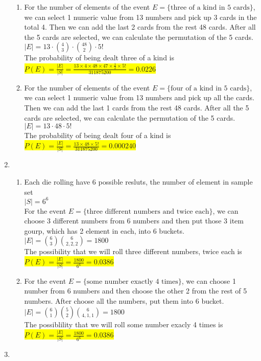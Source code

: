 \documentclass{article}
\begin{document}
\begin{enumerate}
\begin{enumerate}
		\item
		\mysolu
		For the number of elements of the event ${E=\{\text{three of a kind in 5 cards}\}}$, we can select 1 numeric value from 13 numbers and pick up 3 cards in the total 4. Then we can add the last 2 cards from the rest 48 cards. After all the 5 cards are selected, we can calculate the permutation of the 5 cards.\\
		${|E|=13\cdot{4 \choose 3} \cdot{48 \choose 2}\cdot 5!}$\\
		\myansw
		The probability of being dealt three of a kind is\\
		\colorbox{yellow}{
			${P(E)=\frac{|E|}{|S|}=\frac{13\times4\times48\times47\times \frac{1}{2} \times 5!}{311875200}=0.0226}$
		}
		
		\item
		\mysolu
		For the number of elements of the event ${E=\{\text{four of a kind in 5 cards}\}}$, we can select 1 numeric value from 13 numbers and pick up all the cards. Then we can add the last 1 cards from the rest 48 cards. After all the 5 cards are selected, we can calculate the permutation of the 5 cards.\\
		${|E|=13\cdot 48\cdot 5!}$\\
		\myansw
		The probability of being dealt four of a kind is\\
		\colorbox{yellow}{
			${P(E)=\frac{|E|}{|S|}=\frac{13\times48 \times 5!}{311875200}=0.000240}$
		}		
		

	\end{enumerate}
	\item
	\begin{enumerate}
		\item
		Each die rolling have 6 possible resluts, the number of element in sample set\\
		${|S| = 6^6}$\\
		For the event ${E=\{\text{three different numbers and twice each}\}}$, we can choose 3 different numbers from 6 numbers and then put those 3 item gourp, which has 2 element in each, into 6 buckets.\\
		${|E|={6 \choose 3}{6 \choose 2,2,2}=1800}$\\
		\myansw
		The possibility that we will roll three different numbers, twice each is\\
		\colorbox{yellow}{
			${P(E)=\frac{|E|}{|S|}=\frac{1800}{6^6}=0.0386}$
		}
		\item
		For the event ${E=\{\text{some number exactly 4 times}\}}$, we can choose 1 number from 6 numbers and then choose the other 2 from the rest of 5 numbers. After choose all the numbers, put them into 6 bucket.\\
		${|E|={6 \choose 1}{5 \choose 2}{6 \choose 4, 1, 1}=1800}$\\
		\myansw
		The possiblility that we will roll some number exacly 4 times is\\
		\colorbox{yellow}{
			${P(E)=\frac{|E|}{|S|}=\frac{1800}{6^6}=0.0386}$
		}
	\end{enumerate}
	\item
	\begin{enumerate}
		

\end{enumerate}
\end{enumerate}
\end{document}
